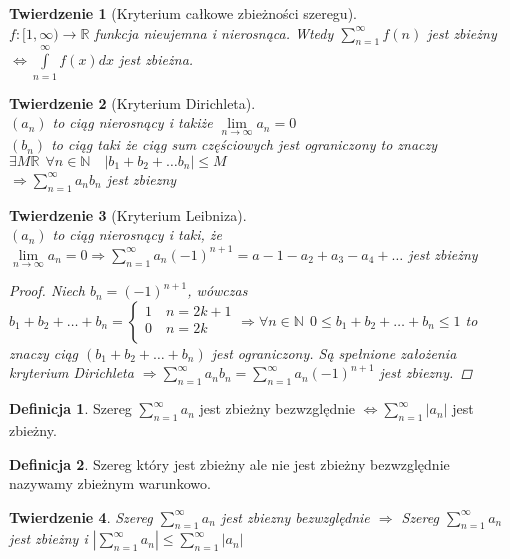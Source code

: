 \documentclass[12pt,a4paper]{article}
\newtheorem{tw}{Twierdzenie}
\theoremstyle{definition}
\newtheorem{df}{Definicja}
\begin{document}
\begin{tw}[Kryterium całkowe zbieżności szeregu]~\\
$f: [1, \infty) \to \mathbb{R}$ funkcja nieujemna i nierosnąca. Wtedy 
$\sum\limits_{n=1}^\infty f(n)$ jest zbieżny $\Leftrightarrow \int\limits_{n=1}^\infty f(x)dx$ jest zbieżna.
\end{tw}

\begin{tw}[Kryterium Dirichleta]~\\
$(a_n)$ to ciąg nierosnący i takiże $\lim\limits_{n\to\infty} a_n = 0$\\
$(b_n)$ to ciąg taki że ciąg sum częściowych jest ograniczony to znaczy 
$\exists M\mathbb{R} ~~ \forall n\in\mathbb{N} \quad |b_1 + b_2 + \dots b_n| \leqslant M$\\
$\Rightarrow \sum\limits_{n=1}^\infty a_nb_n$ jest zbiezny
\end{tw}

\begin{tw}[Kryterium Leibniza]~\\
$(a_n)$ to ciąg nierosnący i taki, że $\lim\limits_{n\to\infty} a_n = 0 \Rightarrow \sum\limits_{n=1}^\infty a_n(-1)^{n+1} = a-1 - a_2 + a_3 - a_4 + \dots$ jest zbieżny
\begin{proof}
Niech $b_n = (-1)^{n+1}$, wówczas $b_1 + b_2 + \dots + b_n = 
	\begin{cases}
		1 \quad n=2k+1\\
		0 \quad n=2k\\
 	\end{cases}
\Rightarrow \forall n\in\mathbb{N} ~~ 0\leqslant b_1 + b_2 + \dots + b_n \leqslant 1$ to znaczy ciąg $(b_1 + b_2 + \dots + b_n)$ jest ograniczony. Są spełnione założenia kryterium Dirichleta $\Rightarrow \sum\limits_{n=1}^\infty a_nb_n = \sum\limits_{n=1}^\infty a_n(-1)^{n+1}$ jest zbiezny. 
\end{proof}
\end{tw}

\begin{df}
Szereg $\sum\limits_{n=1}^\infty a_n$ jest zbieżny bezwzględnie $\Leftrightarrow \sum\limits_{n=1}^\infty |a_n|$ jest zbieżny.
\end{df}

\begin{df}
Szereg który jest zbieżny ale nie jest zbieżny bezwzględnie nazywamy zbieżnym warunkowo.
\end{df}

\begin{tw}
Szereg $\sum\limits_{n=1}^\infty a_n$ jest zbiezny bezwzględnie $\Rightarrow$ Szereg $\sum\limits_{n=1}^\infty a_n$ jest zbieżny i $|\sum\limits_{n=1}^\infty a_n| \leqslant \sum\limits_{n=1}^\infty |a_n|$ 
\end{tw}
\end{document}
